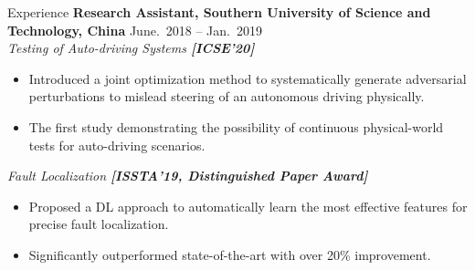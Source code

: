 \begin{rSection}{Experience}
{\bf Research Assistant, Southern University of Science and Technology, China}  \hfill { June.~2018 -- Jan.~2019} \\ 
\textit{Testing of Auto-driving Systems \textbf{[{ICSE'20}]}}
\begin{itemize}[noitemsep,topsep=-5pt]
    \item Introduced a joint optimization method to systematically generate adversarial perturbations to mislead steering of an autonomous driving physically.
    \item The first study demonstrating the possibility of continuous physical-world tests for auto-driving scenarios.
\end{itemize}

\textit{Fault Localization \textbf{[{ISSTA'19, Distinguished Paper Award}]}}
\begin{itemize}[noitemsep,topsep=-5pt]
    \item Proposed a DL approach to automatically learn the most effective features for precise fault localization. 
    \item Significantly outperformed state-of-the-art with over 20\% improvement. \\
\end{itemize}
\end{rSection}

